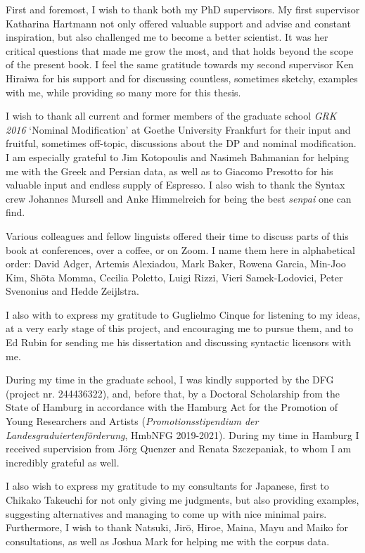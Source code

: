\addchap{\lsAcknowledgementTitle} 
\markdouble{\lsAcknowledgementTitle}

First and foremost, I wish to thank both my PhD supervisors. My first supervisor Katharina Hartmann not only offered valuable support and advise and constant inspiration, but also challenged me to become a better scientist. It was her critical questions that made me grow the most, and that holds beyond the scope of the present book. I feel the same gratitude towards my second supervisor Ken Hiraiwa for his support and for discussing countless, sometimes sketchy, examples with me, while providing so many more for this thesis.

I wish to thank all current and former members of the graduate school \textit{GRK 2016} `Nominal Modification’ at Goethe University Frankfurt for their input and fruitful, sometimes off-topic, discussions about the DP and nominal modification. I am especially grateful to Jim Kotopoulis and Nasimeh Bahmanian for helping me with the Greek and Persian data, as well as to Giacomo Presotto for his valuable input and endless supply of Espresso. I also wish to thank the Syntax crew Johannes Mursell and Anke Himmelreich for being the best \textit{senpai} one can find.

Various colleagues and fellow linguists offered their time to discuss parts of this book at conferences, over a coffee, or on Zoom. I name them here in alphabetical order: David Adger, Artemis Alexiadou, Mark Baker, Rowena Garcia, Min-Joo Kim, Shōta Momma, Cecilia Poletto, Luigi Rizzi, Vieri Samek-Lodovici, Peter Svenonius and Hedde Zeijlstra.

I also with to express my gratitude to Guglielmo Cinque for listening to my ideas, at a very early stage of this project, and encouraging me to pursue them, and to Ed Rubin for sending me his dissertation and discussing syntactic licensors with me.

During my time in the graduate school, I was kindly supported by the DFG (project nr. 244436322), and, before that, by a Doctoral Scholarship from the State of Hamburg in accordance with the Hamburg Act for the Promotion of Young Researchers and Artists (\textit{Promotionsstipendium der Landesgraduiertenförderung}, HmbNFG 2019-2021). During my time in Hamburg I received supervision from Jörg Quenzer and Renata Szczepaniak, to whom I am incredibly grateful as well.

I also wish to express my gratitude to my consultants for Japanese, first to Chikako Takeuchi for not only giving me judgments, but also providing examples, suggesting alternatives and managing to come up with nice minimal pairs. Furthermore, I wish to thank  Natsuki, Jirō, Hiroe, Maina, Mayu and Maiko for consultations, as well as Joshua Mark for helping me with the corpus data.

